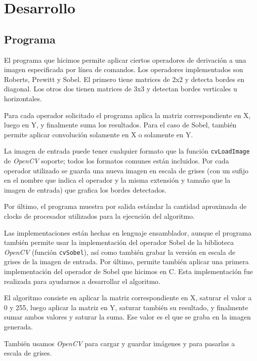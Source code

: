 \section{Desarrollo}

\subsection{Programa}

El programa que hicimos permite aplicar ciertos operadores de derivación a una imagen especificada por línea de comandos. Los operadores implementados son Roberts, Prewitt y Sobel. El primero tiene matrices de 2x2 y detecta bordes en diagonal. Los otros dos tienen matrices de 3x3 y detectan bordes verticales u horizontales.


Para cada operador solicitado el programa aplica la matriz correspondiente en X, luego en Y, y finalmente suma los resultados. Para el caso de Sobel, también permite aplicar convolución solamente en X o solamente en Y.


La imagen de entrada puede tener cualquier formato que la función \texttt{cvLoadImage} de \emph{OpenCV} soporte; todos los formatos comunes están incluidos. Por cada operador utilizado se guarda una nueva imagen en escala de grises (con un sufijo en el nombre que indica el operador y la misma extensión y tamaño que la imagen de entrada) que grafica los bordes detectados.

Por último, el programa muestra por salida estándar la cantidad aproximada de clocks de procesador utilizados para la ejecución del algoritmo.


Las implementaciones están hechas en lenguaje ensamblador, aunque el programa también permite usar la implementación del operador Sobel de la biblioteca \emph{OpenCV} (función \texttt{cvSobel}), así como también grabar la versión en escala de grises de la imagen de entrada. Por último, permite también aplicar una primera implementación del operador de Sobel que hicimos en C. Esta implementación fue realizada para ayudarnos a desarrollar el algoritmo.

El algoritmo consiste en aplicar la matriz correspondiente en X, saturar el valor a 0 y 255, luego aplicar la matriz en Y, saturar también su resultado, y finalmente sumar ambos valores y saturar la suma. Ese valor es el que se graba en la imagen generada.

También usamos \emph{OpenCV} para cargar y guardar imágenes y para pasarlas a escala de grises.

